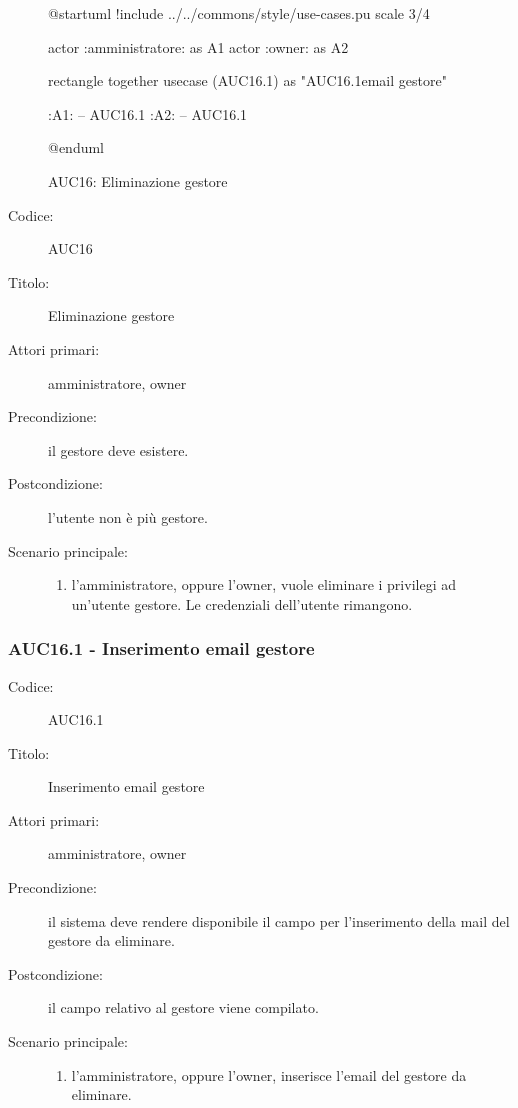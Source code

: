 \documentclass[../../../analisi-dei-requisiti.tex]{subfiles}
\begin{document}
\begin{figure}[h!]
  \centering
  \begin{plantuml}
  @startuml
  !include ../../commons/style/use-cases.pu
  scale 3/4

  actor :amministratore: as A1
  actor :owner: as A2


  rectangle {
    together {
      usecase (AUC16.1) as "AUC16.1\nInserimento email gestore"
    }
  }

  :A1: -- AUC16.1
  :A2: -- AUC16.1

  @enduml
  \end{plantuml}
  \caption{AUC16: Eliminazione gestore}
  \label{fig:auc16}
\end{figure}

\begin{description}
  \item[Codice:] AUC16
  \item[Titolo:] Eliminazione gestore
  \item[Attori primari:] amministratore, owner
  \item[Precondizione:] il gestore deve esistere.
  \item[Postcondizione:] l'utente non è più gestore.
  \item[Scenario principale:]
  \begin{enumerate}
    \item l'amministratore, oppure l'owner, vuole eliminare i privilegi ad un'utente gestore. Le credenziali dell'utente rimangono.
  \end{enumerate}
\end{description}

\subsubsection{AUC16.1 - Inserimento email gestore}%
\label{subsub:AUC16.1}
\begin{description}
  \item[Codice:] AUC16.1
  \item[Titolo:] Inserimento email gestore
  \item[Attori primari:] amministratore, owner
  \item[Precondizione:] il sistema deve rendere disponibile il campo per l'inserimento della mail del gestore da eliminare.
  \item[Postcondizione:] il campo relativo al gestore viene compilato.
  \item[Scenario principale:]
  \begin{enumerate}
    \item l'amministratore, oppure l'owner, inserisce l'email del gestore da eliminare.
  \end{enumerate}
\end{description}
\end{document}
